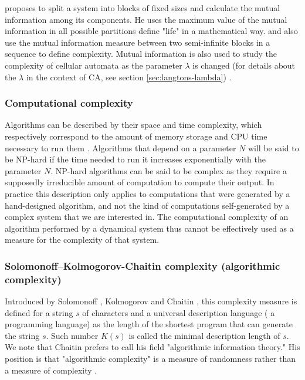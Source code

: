 \textcite{chaitinMathematicalDefinitionLife1987} proposes to split a system into
blocks of fixed sizes and calculate the mutual information among its components.
He uses the maximum value of the mutual information in all possible partitions
define "life" in a mathematical way. \textcite{shawDrippingFaucetModel1984} and
\textcite{grassbergerQuantitativeTheorySelfgenerated1986} also use the mutual
information measure between two semi-infinite blocks in a sequence to define
complexity. Mutual information is also used to study the complexity of cellular
automata as the parameter $\lambda$ is changed (for details about the $\lambda$
in the context of \ac{CA}, see section \ref{sec:langtons-lambda})
\parencite{gutowitzMethodsDesigningCellular1988,
  liTransitionPhenomenaCellular1990}.


\subsubsection{Computational complexity}
Algorithms can be described by their space and time complexity, which
respectively correspond to the amount of memory storage and CPU time necessary
to run them \parencite{traubInformationUncertaintyComplexity1983,
  packelRecentDevelopmentsInformationbased1987,
  hopcroftIntroductionAutomataTheory2007}. Algorithms that depend on a parameter
$N$ will be said to be NP-hard if the time needed to run it increases
exponentially with the parameter $N$. NP-hard algorithms can be said to be
complex as they require a supposedly irreducible amount of computation to
compute their output. In practice this description only applies to computations
that were generated by a hand-designed algorithm, and not the kind of
computations self-generated by a complex system that we are interested in. The
computational complexity of an algorithm performed by a dynamical system thus
cannot be effectively used as a measure for the complexity of that system.

\subsubsection{Solomonoff–Kolmogorov-Chaitin complexity (algorithmic
  complexity)}

Introduced by Solomonoff \parencite{solomonoffPreliminaryReportGeneral1960},
Kolmogorov \parencite{kolmogorovThreeApproachesQuantitative1968} and Chaitin
\parencite{chaitinLengthProgramsComputing1969,
  chaitinAlgorithmicInformationTheory1977,
  chaitinInformationRandomnessIncompleteness1990}, this complexity measure is
defined for a string $s$ of characters and a universal description language (\eg
a programming language) as the length of the shortest program that can generate
the string $s$. Such number $K(s)$ is called the minimal description length of
$s$. We note that Chaitin prefers to call his field "algorithmic information
theory." His position is that "algorithmic complexity" is a measure of
randomness rather than a measure of complexity
\parencite{chaitinInformationRandomnessIncompleteness1990}.

